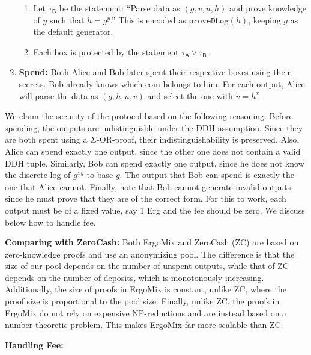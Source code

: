 \documentclass[11pt]{article}
\newcommand{\authnote}[2]{\marginpar{\parbox{\marginparwidth}{\tiny %
  \textsf{#1 {\textcolor{blue}{notes: #2}}}}}%
  \textcolor{blue}{\textbf{\dag}}}
\newcommand{\authnote}[2]{
  \textsf{#1 \textcolor{blue}{: #2}}}
\newcommand{\authnote}[2]{}
\newcommand{\snote}[1]{{\authnote{\textcolor{yellow}{Scalahub notes}}{#1}}}
\newcommand{\mixname}{ErgoMix\xspace}
\begin{document}
\begin{enumerate}
\begin{enumerate}
		\item Let $\tau_{\textsf{B}}$ be the statement: ``Parse data as $(g, v, u, h)$ and
		prove knowledge of $y$ such that $h = {g}^{y}$.'' 
This is encoded as $\texttt{proveDLog}(h)$, keeping $g$ as the default generator.
		
		\item Each box is protected by the statement $\tau_\textsf{A} \lor \tau_\textsf{B}$. 
		
	\end{enumerate}
	\item \textbf{Spend:} Both Alice and Bob later spent their respective boxes using their secrets. Bob already knows which coin belongs to him. For each output, Alice will parse the data as $(g, h, u, v)$ and select the one with $v = h^x$. 
\end{enumerate}

We claim the security of the protocol based on the following reasoning. Before spending, the outputs are indistinguisble under the DDH assumption. Since they are both spent using a $\Sigma$-OR-proof, their indistinguishability is preserved. Also, Alice can spend exactly one output, since the other one does not contain a valid DDH tuple. Similarly, Bob can spend exactly one output, since he does not know the discrete log of $g^{xy}$ to base $g$. The output that Bob can spend is exactly the one that Alice cannot. Finally, note that Bob cannot generate invalid outputs since he must prove that they are of the correct form. 
For this to work, each output must be of a fixed value, say 1 Erg and the fee should be zero. We discuss below how to handle fee. 
 
\textbf{Comparing with ZeroCash:} Both \mixname and ZeroCash (ZC) are based on zero-knowledge proofs and use an anonymizing pool. The difference is that the size of our pool depends on the number of unspent outputs, while that of ZC depends on the number of deposits, which is monotonously increasing. Additionally, the size of proofs in \mixname is constant, unlike ZC, where the proof size is proportional to the pool size. Finally, unlike ZC, the proofs in \mixname do not rely on expensive NP-reductions and are instead based on a number theoretic problem. This makes \mixname far more scalable than ZC. 

\textbf{Handling Fee:} 
\snote{To do: describe fee handling.}
\end{document}
